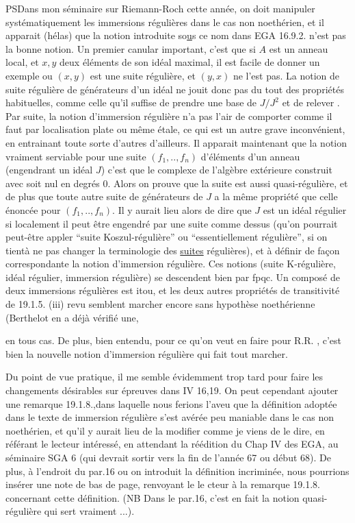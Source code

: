 PS\quad Dans mon séminaire sur Riemann-Roch cette année, on doit manipuler
systématiquement les immersions régulières dans le cas non noethérien,
et il apparait (hélas) que la notion introduite so\uline{u}s ce nom dans EGA
16.9.2. n'est pas la bonne notion. Un premier canular important, c'est
que si $A$ est un anneau local, et $x,y$ deux éléments de son idéal maximal,
il est facile de donner un exemple ou $(x,y)$ est une suite régulière,
et $(y,x)$ ne l'est pas. La notion de suite régulière de générateurs d'un
idéal ne jouit donc pas du tout des propriétés habituelles, comme
celle qu'il suffise de prendre une base de $J/J^2$ et de relever . Par suite,
la notion d'immersion régulière n'a pas l'air de  comporter
comme il faut par localisation plate ou même étale, ce qui est un autre
grave inconvénient, en entrainant toute sorte d'autres d'ailleurs. Il
apparait maintenant que la notion vraiment serviable pour une suite
$(f_1,..,f_n)$ d'éléments d'un anneau (engendrant un idéal $J$) c'est que
le complexe de l'algèbre extérieure construit avec soit nul en degrés
$0$. Alors on prouve que la suite est aussi quasi-régulière, et de
plus que toute autre suite de  générateurs de $J$ a la même propriété
que celle énoncée pour $(f_1,..,f_n)$. Il y aurait lieu alors de dire que
$J$ est un idéal régulier si localement il peut être engendré par une
suite comme dessus (qu'on pourrait peut-être appler ``suite Koszul-régulière'' ou ``essentiellement régulière'', si on tientà ne pas changer la
terminologie des \uline{suites} régulières), et à définir de façon correspondante
la notion d'immersion régulière. Ces notions (suite K-régulière,
idéal régulier, immersion régulière) se descendent bien par fpqc. Un
composé de deux immersions régulières est itou, et les deux autres
propriétés de transitivité de 19.1.5. (iii) revu semblent marcher
encore sans hypothèse noethérienne (Berthelot en a déjà vérifié une,

en tous cas. De plus, bien entendu, pour ce qu'on veut en faire pour
R.R. , c'est bien la nouvelle notion d'immersion régulière qui fait
tout marcher.

Du point de vue pratique, il me semble évidemment trop tard pour
faire les changements désirables sur épreuves dans IV 16,19. On peut
cependant ajouter une remarque 19.1.8.,dans laquelle nous ferions l'aveu
\margin{\handwritten{\rule{0.25pt}{4.8cm}\hspace{2pt}\rule{0.25pt}{4.8cm}}}que  la définition adoptée dans le texte de immersion régulière s'est
 avérée peu maniable dans le cas non noethérien, et qu'il y aurait
lieu de la modifier comme je viens de le dire, en référant le lecteur
intéressé,  en attendant la réédition du Chap IV des EGA, au séminaire
SGA 6 (qui devrait sortir vers la fin de l'année 67 ou début 68). De
plus, à l'endroit du par.16 ou on introduit la définition incriminée,
nous pourrions insérer une note de bas de page, renvoyant le le cteur
à la remarque 19.1.8. concernant cette définition. (NB Dans le par.16,
c'est en fait la notion quasi-régulière qui sert vraiment ...).


